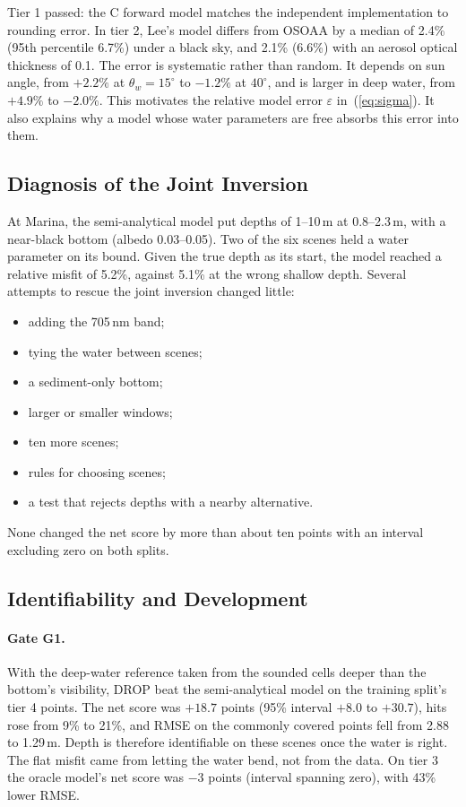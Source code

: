 \documentclass[remotesensing,article,submit,pdftex]{Definitions/mdpi}
\begin{document}
Tier 1 passed: the C forward model matches the independent implementation to rounding error. In tier 2, Lee's model differs from OSOAA by a median of 2.4\% (95th percentile 6.7\%) under a black sky, and 2.1\% (6.6\%) with an aerosol optical thickness of 0.1. The error is systematic rather than random. It depends on sun angle, from $+2.2\%$ at $\theta_w = 15^\circ$ to $-1.2\%$ at $40^\circ$, and is larger in deep water, from $+4.9\%$ to $-2.0\%$. This motivates the relative model error $\varepsilon$ in~(\ref{eq:sigma}). It also explains why a model whose water parameters are free absorbs this error into them.

\subsection{Diagnosis of the Joint Inversion}\label{sec:intro-diag}

At Marina, the semi-analytical model put depths of 1--10\,m at 0.8--2.3\,m, with a near-black bottom (albedo 0.03--0.05). Two of the six scenes held a water parameter on its bound. Given the true depth as its start, the model reached a relative misfit of 5.2\%, against 5.1\% at the wrong shallow depth. Several attempts to rescue the joint inversion changed little:
\begin{itemize}
\item adding the 705\,nm band;
\item tying the water between scenes;
\item a sediment-only bottom;
\item larger or smaller windows;
\item ten more scenes;
\item rules for choosing scenes;
\item a test that rejects depths with a nearby alternative.
\end{itemize}
None changed the net score by more than about ten points with an interval excluding zero on both splits.

\subsection{Identifiability and Development}\label{sec:dev}

\paragraph{Gate G1.} With the deep-water reference taken from the sounded cells deeper than the bottom's visibility, DROP beat the semi-analytical model on the training split's tier 4 points. The net score was $+18.7$ points (95\% interval $+8.0$ to $+30.7$), hits rose from 9\% to 21\%, and RMSE on the commonly covered points fell from 2.88 to 1.29\,m. Depth is therefore identifiable on these scenes once the water is right. The flat misfit came from letting the water bend, not from the data. On tier 3 the oracle model's net score was $-3$ points (interval spanning zero), with 43\% lower RMSE.
\end{document}
